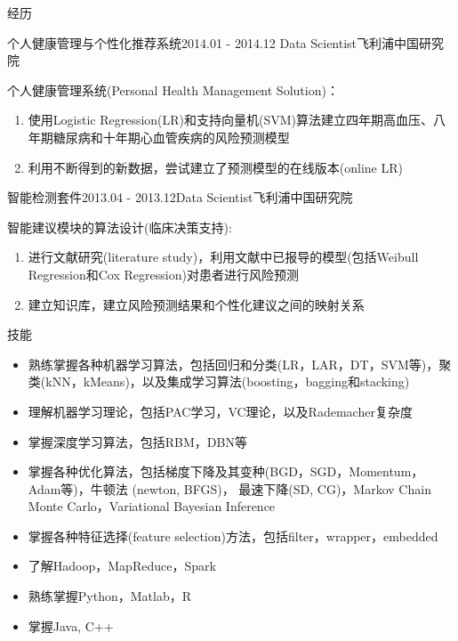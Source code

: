 \documentclass{resume} %
\begin{document}
\begin{rSection}{经历}
\begin{rSubsection}{个人健康管理与个性化推荐系统}{2014.01 - 2014.12}{
		Data Scientist}{飞利浦中国研究院}
\item 个人健康管理系统(Personal Health Management Solution)：
\begin{enumerate}
\item 使用Logistic Regression(LR)和支持向量机(SVM)算法建立四年期高血压、八年期糖尿病和十年期心血管疾病的风险预测模型
\item 利用不断得到的新数据，尝试建立了预测模型的在线版本(online LR)
\end{enumerate}
\end{rSubsection}

\begin{rSubsection}{智能检测套件}{2013.04 - 2013.12}{Data Scientist}{飞利浦中国研究院}
\item 智能建议模块的算法设计(临床决策支持):
\begin{enumerate}
\item 进行文献研究(literature study)，利用文献中已报导的模型(包括Weibull Regression和Cox Regression)对患者进行风险预测
\item 建立知识库，建立风险预测结果和个性化建议之间的映射关系
\end{enumerate}
\end{rSubsection}


\end{rSection}


\begin{rSection}{技能}

\begin{itemize}
	\item 熟练掌握各种机器学习算法，包括回归和分类(LR，LAR，DT，SVM等)，聚类(kNN，kMeans)，以及集成学习算法(boosting，bagging和stacking)
	\item 理解机器学习理论，包括PAC学习，VC理论，以及Rademacher复杂度
	\item 掌握深度学习算法，包括RBM，DBN等
	\item 掌握各种优化算法，包括梯度下降及其变种(BGD，SGD，Momentum，Adam等)，牛顿法 (newton, BFGS)， 最速下降(SD, CG)，Markov Chain Monte Carlo，Variational Bayesian Inference 
	\item 掌握各种特征选择(feature selection)方法，包括filter，wrapper，embedded
	\item 了解Hadoop，MapReduce，Spark
	\item 熟练掌握Python，Matlab，R
	\item 掌握Java, C++
\end{itemize}

\end{rSection}
\end{document}
